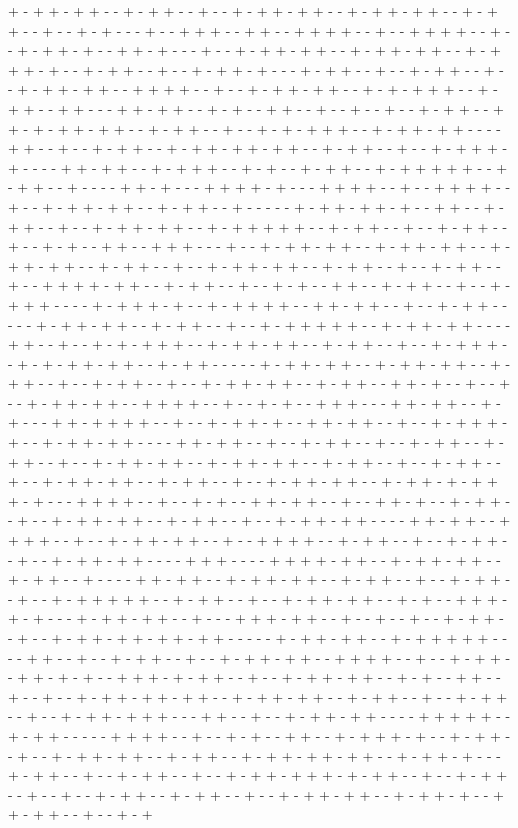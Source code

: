 + - + + - + + - - + - + + - - + - - + - + + - + + - - + - + + - + + - - + - + + - - + - - + - + - - - + - - + + + - - + + - - + + + + - - + - - + + + + - - + - - + - + + - + - - + + - + - - - + - - + - + + - + + - - + - + + - + + - - + - + + + - + - - + - + + - - + - - + - + + - + - - - + - + + - - + - - + - + + - - + - - + - + + - + + - - + + + + - - + - - + - + + - + + - - + - + - + + + - - + - + + - - + + - - - + + - + + - - + - + - - + + - - + - - + - - + - - + - + + - - + + - + - + + - + + - - + - + + - - + - - + - + - + + + - - + - + + - + + - - - - + + - - + - - + - + + - - + - + + - + + - + + - - + - + + - - + - - + - + + + - + - - - - + + - + + - - + - + + + - - + - + - - + - + + - - + - + + + + + - - + - + + - - + - - - - + + - + - - - + + + + - + - - - + + + + - - + - - + + + + - - + - - + - + + - + + - - + - + + - - + - - - - - + - + + - + + - + - - + + - - + - + + - - + - - + - + + - + + - - + - + + + + + - - + - + + - - + - - + - + + - - + - - + - + - - + + - - + + + - - - + - - + - + + - + + - - + - + + - + + - - + - + + - + + - - + - + + - - + - - + - + + - + + - - + - + + - - + - - + - + + - - + - - + + + + - + + - - + - + + - - + - - + - + - - + + - - + - + + - - + - - + - + + + - - - - + - + + + - + - - + - + + + + - - + + - + + - - + - - + - + + - - - - - + - + + - + + - - + - + + - - + - - + - + + + + + - - + - + + - + + - - - - + + - - + - - + - + - + + + - - + - + + - + + - - + - + + - - + - - + - + + + - - + - + - + + - + + - - + - + + - - - - - + - + + - + + - - + - + + - + + - - + - + + - - + - - + - + + - - + - - + - + + - + + - - + - + + - - + + - + - - + - - + - - + - + + - + + - - + + + + - - + - - + - + - - + + + - - - + + - + + - - + - + - - - + + - + + + + - - + - - + - + + - + - - + + - + + - - + - - + - + + + - + - - + - + + - + + - - - - + + - + + - - + - - + - + + - - + - - + - + + - - + - + + - - + - - + - + + - + + - - + - + + - + + - - + - + + - - + - - + - + + - - + - - + - + + - + + - - + - + + - - + - - + - + + - + + - - + - + + - + - + + + - + - - - + + + + - - + - - + - + - - + + - + + - - + - - + + - + - - + - + + - - + - - + - + + - + + - - + - + + - - + - - + - + + - + + - - - - + + - + + - - + + + + - - + - - + - + + - + + - - + - - + + + + - - + - + + - - + - - + - + + - - + - - + - + + - + + - - - - + + + - - - - + + + + - + + - - + - + + - + + - - + - + + - - + - - - - + + - + + - - + - + + - + + - - + - + + - - + - - + - + + - - + - - + - + + + + + - - + - + + - - + - - + - + + - + + - - + - + - - + + + - + - + - - - + - + + - + + - - + - - - + + + - + + - - + - - + - - + - - + - + + - - + - - + - + + - + + - + + - + + - - - - - + - + + - + + - - + - + + + + + - - - - + + - - + - - + - + + - - + - - + - + + - + + - - + + + + - - + - - + - + + - - + + - + - + - - + + + - + - + + - - + - - + - + + - + + - - + - + - - + + - - + - - + - - + - + + - + + - + + - - + - + + - + + - - + - + + - - + - - + - + + - - + - - + - + + - + + + - - - + + - - + - - + - + + - + + - - - - + + + + + - - + - + + - - - - - + + + + - - + - - + - + - - + + - - + - + + + - + - - + - + + - - + - - + - + + - + + - - + - + + - - + - + + - + + - + + - - + - + + - + - - - + - + + - - + - - + - + + - - + - - + - + + - + + + - + - + + - - + - - + - + + - - + - - + - - + - + + - - + - + + - - + - - + - + + - + + - - + - + + - + - - + + - + + - - + - - + - + 